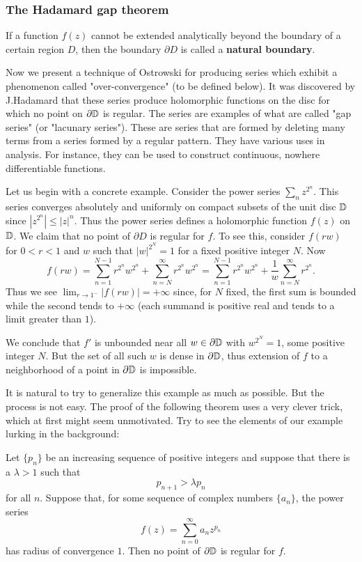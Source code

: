 \subsubsection{The Hadamard gap theorem}
\begin{definition}
If a function $f(z)$ cannot be extended analytically beyond the boundary of a certain region $D$, then the boundary $\partial D$ is called a \textbf{natural boundary}.
\end{definition}
Now we present a technique of Ostrowski for producing series which exhibit a phenomenon called "over-convergence" (to be defined below). It was discovered by J.Hadamard that these series produce holomorphic
functions on the disc for which no point on $\partial\mathbb{D}$ is regular. The series are examples of what are called "gap series" (or "lacunary series"). These are series that are formed by deleting many terms from a series formed by a regular pattern. They have various uses in analysis. For instance, they can be used to construct continuous, nowhere differentiable functions.\par
Let us begin with a concrete example. Consider the power series $\sum_nz^{2^n}$. This series converges absolutely and uniformly on compact subsets of the unit disc $\mathbb{D}$ since $|z^{2^n}|\leq|z|^n$. Thus the power series defines a holomorphic function $f(z)$ on $\mathbb{D}$. We claim that no point of $\partial D$ is regular for $f$. To see this, consider $f(rw)$ for $0<r<1$ and $w$ such that $|w|^{2^N}=1$ for a fixed positive integer $N$. Now
\[f(rw)=\sum_{n=1}^{N-1}r^{2^n}w^{2^n}+\sum_{n=N}^{\infty}r^{2^n}w^{2^n}=\sum_{n=1}^{N-1}r^{2^n}w^{2^n}+\frac{1}{w}\sum_{n=N}^{\infty}r^{2^n}.\]
Thus we see $\lim_{r\to 1^-}|f(rw)|=+\infty$ since, for $N$ fixed, the first sum is bounded while the second tends to $+\infty$ (each summand is positive real and tends to a limit greater than $1$).\par
We conclude that $f'$ is unbounded near all $w\in\partial\mathbb{D}$ with $w^{2^N}=1$, some positive integer $N$. But the set of all such $w$ is dense in $\partial\mathbb{D}$, thus extension of $f$ to a neighborhood of a point in $\partial\mathbb{D}$ is impossible.\par
It is natural to try to generalize this example as much as possible. But the process is not easy. The proof of the following theorem uses a very clever trick, which at first might seem unmotivated. Try to see the elements of our example lurking in the background:
\begin{theorem}\label{Hadamard gap theorem}
Let $\{p_n\}$ be an increasing sequence of positive integers and suppose that there is a $\lambda>1$ such that
\[p_{n+1}>\lambda p_n\]
for all $n$. Suppose that, for some sequence of complex numbers $\{a_n\}$, the power series
\[f(z)=\sum_{n=0}^{\infty}a_nz^{p_n}\]
has radius of convergence $1$. Then no point of $\partial\mathbb{D}$ is regular for $f$.
\end{theorem}
